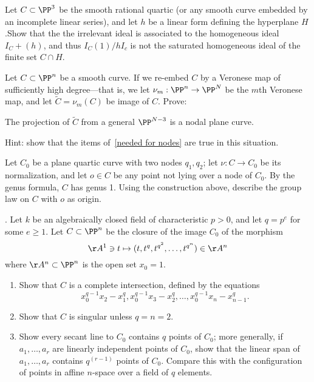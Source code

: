 \begin{exercise}\label{bad restriction}
Let $C\subset \PP^3$ be the smooth rational quartic (or any smooth curve embedded by an incomplete linear series), and let $h$ be a linear form defining the hyperplane $H$.Show that
the the irrelevant ideal is associated to the 
homogeneous ideal $I_C+(h)$, and thus $I_C(1)/hI_c$ is not the saturated homogeneous ideal of the finite
set $C\cap H$. 
\end{exercise}


\begin{exercise}
Let $C\subset \PP^n$ be a smooth curve. If we re-embed $C$ by a Veronese map of sufficiently high degree---that is, we let $\nu_m : \PP^n \to \PP^N$ be the $m$th Veronese map, and let $\widetilde C = \nu_m(C)$ be image of $C$. Prove:

\begin{proposition}\label{positive characteristic nodes}
The projection of $\widetilde C$ from a general $\PP^{N-3}$ is a nodal plane curve.
\end{proposition}

Hint: show that the items of~\ref{needed for nodes}  are true in this situation.
\end{exercise}

\begin{exercise}
Let $C_0$ be a plane quartic curve with two nodes $q_1, q_2$; let $\nu : C \to C_0$ be its normalization, and let $o \in C$ be any point not lying over a node of $C_0$.
By the genus formula, $C$ has genus 1. Using the construction above, describe the group law on $C$ with $o$ as origin.
\end{exercise}

\begin{exercise}\label{strange curves} \cite{Rathmann}. Let $k$ be an algebraically closed field of characteristic $p>0$, and let $q=p^e$ for some $e\geq 1$. Let $C\subset \PP^n$
be the closure of the image $C_0$ of the morphism
$$
\AA^1 \ni t \mapsto (t, t^q, t^{q^2}, \dots , t^{q^{n}}) \in \AA^n
$$
where $\AA^n\subset \PP^n$ is the open set $x_0=1$. 
\begin{enumerate}
\item Show that $C$ is a complete intersection, defined by the equations
$$
x_0^{q-1}x_2 - x_1^q, x_0^{q-1}x_3 - x_2^q,\dots, 
x_0^{q-1}x_n - x_{n-1}^q.
$$
\item Show that $C$ is singular unless $q = n = 2$.
\item Show every secant line to $C_0$ contains $q$ points of $C_0$; more generally, if
$a_1, \dots, a_r$ are linearly independent points of $C_0$, show that the linear span of
$a_1, \dots, a_r$ contains $q^{(r-1)}$ points of $C_0$.  Compare this with the configuration of
points in affine $n$-space over a field of $q$ elements.
\end{enumerate}
\end{exercise}

